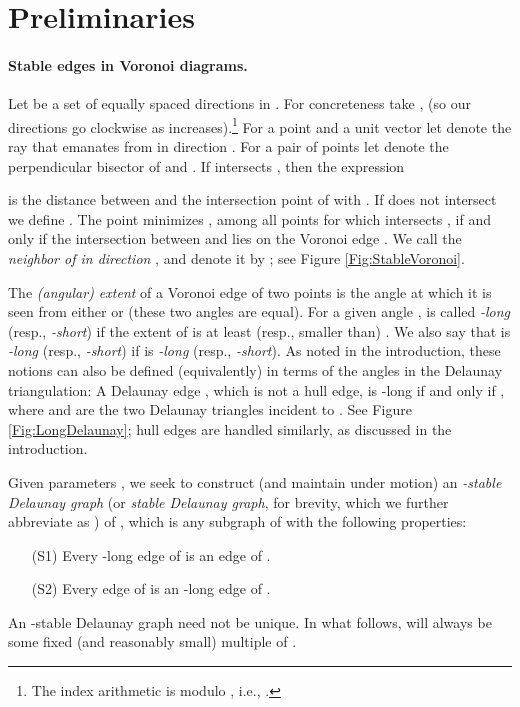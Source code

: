 \documentclass[letter,11pt]{article}
\newcommand{\seclab}[1]{\label{sec:#1}}
\begin{document}
\section{Preliminaries}\label{sec:Prelim}
\seclab{sdg}\seclab{ddg}
\paragraph{Stable edges in Voronoi diagrams.}
Let  be a set of 
 equally spaced directions in . For 
concreteness take ,  (so our directions  go clockwise as  increases).\footnote{The index arithmetic is modulo , i.e., .} 
For a point  and a unit vector
 let  denote the ray  that
emanates from  in direction .  For a pair of points  
let  denote the perpendicular bisector of  and .
If  intersects , then the expression

is the distance
between  and the intersection point of  with
.
If  does not
intersect  we define .
 The point  minimizes , among all points
 for which  intersects , if and only if the
intersection between  and  lies on the Voronoi edge . We call  the {\em neighbor of  in direction }, 
and denote it by ; see Figure \ref{Fig:StableVoronoi}.

The {\em (angular) extent} of a Voronoi edge  of two points 
 is
the angle at which it is seen from either  or  (these two
angles are equal).  For a given angle , 
  is  called {\em -long} (resp., {\em
-short}) if the extent of  is at least
 (resp., smaller than) . We also say that
 is {\em -long} (resp., {\em
-short}) if  is {\em -long} (resp., {\em
-short}). As noted in the introduction, these notions can also be defined (equivalently) in terms of the angles in the Delaunay triangulation: A Delaunay edge , which is not a hull edge, is -long if and only if ,
where  and  are the two Delaunay triangles incident to . See Figure \ref{Fig:LongDelaunay}; hull edges are handled similarly, as discussed in the introduction.


Given parameters , we seek to construct (and
maintain under motion) an \emph{-stable Delaunay
graph} (or \emph{stable Delaunay graph}, for brevity, which we further abbreviate as ) of , which
is any subgraph  of  with the following properties:
\begin{itemize}
\item[(S1)]
  Every -long edge of  is an edge of
  .
\item[(S2)]
  Every edge of  is an -long edge of .
\end{itemize}
An -stable Delaunay graph need not be
unique. In what follows,  will always be some fixed (and reasonably small) multiple of .
\end{document}
